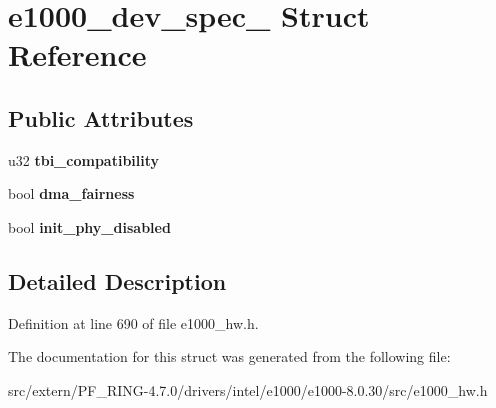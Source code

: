 \hypertarget{structe1000__dev__spec__82543}{
\section{e1000\_\-dev\_\-spec\_ Struct Reference}
\label{structe1000__dev__spec__82543}
}
\subsection*{Public Attributes}
\begin{DoxyCompactItemize}
\item 
\hypertarget{structe1000__dev__spec__82543_a583fbcd980f1dc1427d34295863d8352}{
u32 {\bfseries tbi\_\-compatibility}}
\label{structe1000__dev__spec__82543_a583fbcd980f1dc1427d34295863d8352}

\item 
\hypertarget{structe1000__dev__spec__82543_a39cbe37a9317b8dd074e536202b1821f}{
bool {\bfseries dma\_\-fairness}}
\label{structe1000__dev__spec__82543_a39cbe37a9317b8dd074e536202b1821f}

\item 
\hypertarget{structe1000__dev__spec__82543_aae4a10ca1be108ba615e28952caedf4a}{
bool {\bfseries init\_\-phy\_\-disabled}}
\label{structe1000__dev__spec__82543_aae4a10ca1be108ba615e28952caedf4a}

\end{DoxyCompactItemize}


\subsection{Detailed Description}


Definition at line 690 of file e1000\_\-hw.h.



The documentation for this struct was generated from the following file:\begin{DoxyCompactItemize}
\item 
src/extern/PF\_\-RING-\/4.7.0/drivers/intel/e1000/e1000-\/8.0.30/src/e1000\_\-hw.h\end{DoxyCompactItemize}
